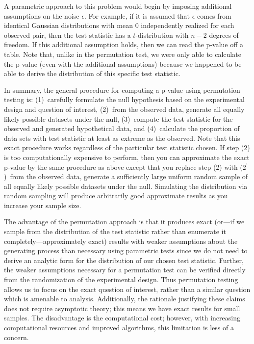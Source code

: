 \begin{example}
A parametric approach to this problem would begin by imposing additional
assumptions on the noise $\epsilon$.  For example, if it is assumed that
$\epsilon$ comes from identical Gaussian distributions with mean 0
independently realized for each observed pair, then the test statistic has a
$t$-distribution with $n-2$ degrees of freedom.  If this additional assumption
holds, then we can read the p-value off a table.  Note that, unlike in the
permutation test, we were only able to calculate the p-value (even with the
additional assumptions) because we happened to be able to derive the
distribution of this specific test statistic.
\end{example}

In summary, the general procedure for computing a p-value using permutation
testing is: (1)~carefully formulate the null hypothesis based on the
experimental design and question of interest, (2)~from the observed data,
generate all equally likely possible datasets under the null, (3)~compute the
test statistic for the observed and generated hypothetical data, and 
(4)~calculate the proportion of data sets with test statistic at least as extreme
as the observed.  Note that this exact procedure works regardless of the
particular test statistic chosen.  If step (2) is too computationally expensive
to perform, then you can approximate the exact p-value by the same procedure as
above except that you replace step (2) with ($2^\prime$)~from the observed
data, generate a sufficiently large uniform random sample of all equally likely
possible datasets under the null. Simulating the distribution via random
sampling will produce arbitrarily good approximate results as you increase your
sample size.

The advantage of the permutation approach is that it produces exact (or---if we
sample from the distribution of the test statistic rather than enumerate it
completely---approximately exact) results with weaker assumptions 
about the generating process than necessary using parametric tests since we do
not need to derive an analytic form for the distribution of our chosen test statistic.
Further, the weaker assumptions necessary for a permutation test can be
verified directly from the randomization of the experimental design.  Thus
permutation testing allows us to focus on the exact question of interest,
rather than a similar question which is amenable to analysis.  Additionally,
the rationale justifying these claims does not require asymptotic theory; this
means we have exact results for small samples.  The disadvantage is the
computational cost; however, with increasing computational resources and
improved algorithms, this limitation is less of a concern.

